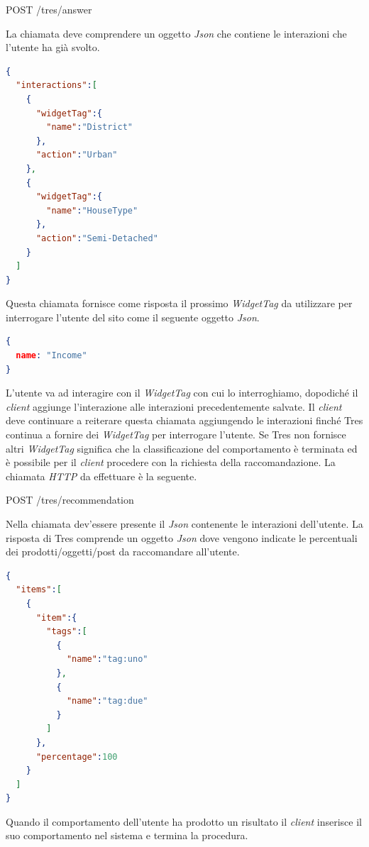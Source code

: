 \begin{center}
POST    /tres/answer
\end{center}
\newpage
La chiamata deve comprendere un oggetto \emph{Json} che contiene le interazioni che l'utente ha già svolto.
\begin{lstlisting}[language=json,firstnumber=1]
{
  "interactions":[
    {
      "widgetTag":{
        "name":"District"
      },
      "action":"Urban"
    },
    {
      "widgetTag":{
        "name":"HouseType"
      },
      "action":"Semi-Detached"
    }  
  ]
}
\end{lstlisting}
Questa chiamata fornisce come risposta il prossimo \emph{WidgetTag} da utilizzare per interrogare l'utente del sito come il seguente oggetto \emph{Json}.
\begin{lstlisting}[language=json,firstnumber=1]
{
  name: "Income"
}
\end{lstlisting}
L'utente va ad interagire con il \emph{WidgetTag} con cui lo interroghiamo, dopodiché il \emph{client} aggiunge l'interazione alle interazioni precedentemente salvate. Il \emph{client} deve continuare a reiterare questa chiamata aggiungendo le interazioni finché Tres continua a fornire dei \emph{WidgetTag} per interrogare l'utente. Se Tres non fornisce altri \emph{WidgetTag} significa che la classificazione del comportamento è terminata ed è possibile per il \emph{client} procedere con la richiesta della raccomandazione. La chiamata \emph{HTTP} da effettuare è la seguente.
\begin{center}
POST    /tres/recommendation
\end{center}
Nella chiamata dev'essere presente il \emph{Json} contenente le interazioni dell'utente. La risposta di Tres comprende un oggetto \emph{Json} dove vengono indicate le percentuali dei prodotti/oggetti/post da raccomandare all'utente.
\begin{lstlisting}[language=json,firstnumber=1]
{
  "items":[
    {
      "item":{
        "tags":[
          {
            "name":"tag:uno"
          },
          {
            "name":"tag:due"
          }
        ]
      },
      "percentage":100
    }
  ]
}
\end{lstlisting}
Quando il comportamento dell'utente ha prodotto un risultato il \emph{client} inserisce il suo comportamento nel sistema e termina la procedura.
